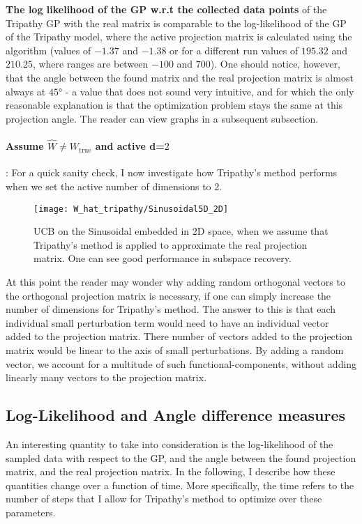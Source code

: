 \textbf{The log likelihood of the GP w.r.t the collected data points} of the Tripathy GP with the real matrix is comparable to the log-likelihood of the GP of the Tripathy model, where the active projection matrix is calculated using the algorithm (values of $-1.37$ and $-1.38$ or for a different run values of $195.32$ and $210.25$, where ranges are between  $-100$ and $700$).
One should notice, however, that the angle between the found matrix and the real projection matrix is almost always at $45°$ - a value that does not sound very intuitive, and for which the only reasonable explanation is that the optimization problem stays the same at this projection angle.
The reader can view graphs in a subsequent subsection.

\paragraph{Assume $\hat{W} \neq W_{\text{true}}$ and active d=$2$ }: For a quick sanity check, I now investigate how Tripathy's method performs when we set the active number of dimensions to 2.

\begin{figure}[H]
  \centering
      \texttt{[image: W\_hat\_tripathy/Sinusoidal5D\_2D]}
  \caption{UCB on the Sinusoidal embedded in 2D space, when we assume that Tripathy's method is applied to approximate the real projection matrix.
  One can see good performance in subspace recovery.}
\end{figure}

At this point the reader may wonder why adding random orthogonal vectors to the orthogonal projection matrix is necessary, if one can simply increase the number of dimensions for Tripathy's method.
The answer to this is that each individual small perturbation term would need to have an individual vector added to the projection matrix.
There number of vectors added to the projection matrix would be linear to the axis of small perturbations.
By adding a random vector, we account for a multitude of such functional-components, without adding linearly many vectors to the projection matrix.


\subsection{Log-Likelihood and Angle difference measures}

An interesting quantity to take into consideration is the log-likelihood of the sampled data with respect to the GP, and the angle between the found projection matrix, and the real projection matrix.
In the following, I describe how these quantities change over a function of time.
More specifically, the time refers to the number of steps that I allow for Tripathy's method to optimize over these parameters.

